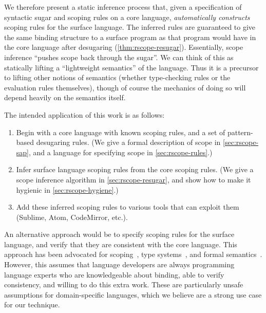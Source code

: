 We therefore present a static inference process that, given a
specification of syntactic sugar and scoping rules on a core language,
\emph{automatically constructs} scoping rules for the surface
language. The inferred rules are guaranteed to give the same binding
structure to a surface program as that program would have in the core language
after desugaring (\cref{thm:rscope-resugar}).
Essentially, scope inference ``pushes scope back through the sugar''. We
can think of this as statically lifting a ``lightweight semantics'' of
the language. Thus it is a precursor to lifting other notions of semantics
(whether type-checking rules or the evaluation rules themselves),
though of course the mechanics of doing so will depend heavily on the
semantics itself.

The intended application of this work is as follows:
\begin{enumerate}
\item Begin with a core language with known scoping rules, and a set
  of pattern-based desugaring rules. (We give a formal description of
  scope in \cref{sec:rscope-sap}, and a language for specifying scope in
  \cref{sec:rscope-rules}.)
\item Infer surface language scoping rules from the core scoping
  rules. (We give a scope inference algorithm in
  \cref{sec:rscope-resugar}, and show how to make it hygienic in
  \cref{sec:rscope-hygiene}.)
\item Add these inferred scoping rules to various tools that can exploit
  them (Sublime, Atom, CodeMirror, etc.).
\end{enumerate}

An alternative approach would be to specify scoping rules for the
surface language, and verify that they are consistent with the core
language. This approach has been advocated for
scoping~\cite{herman-hygiene,stansifer-romeo},
type systems~\cite{typechecking-exts},
and formal semantics~\cite{ziggurat}.
However, this assumes that language developers are always programming
language experts who are knowledgeable about binding, able to verify consistency, and willing
to do this extra work. These are particularly unsafe assumptions for
domain-specific languages, which we believe are a strong use case for
our technique.

